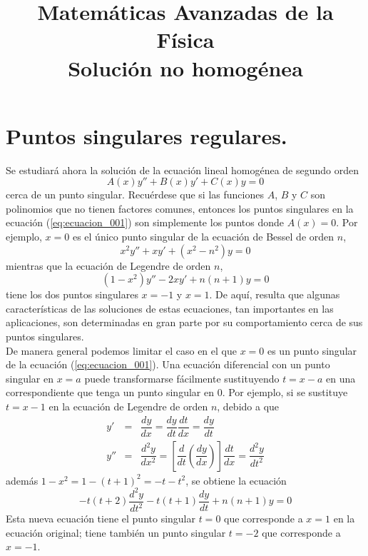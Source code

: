 
\title{Matemáticas Avanzadas de la Física \\ {\large Solución no homogénea}}
\date{ }

\renewcommand\labelenumii{\theenumi.{\arabic{enumii}}}
\maketitle
\fontsize{14}{14}\selectfont
\section{Puntos singulares regulares.}
Se estudiará ahora la solución de la ecuación lineal homogénea de segundo orden
\begin{equation}
A(x) y'' +  B(x)y' + C(x)y = 0
\label{eq:ecuacion_001}
\end{equation}
cerca de un punto singular. Recuérdese que si las funciones $A$, $B$ y $C$ son polinomios que no tienen factores comunes, entonces los puntos singulares en la ecuación (\ref{eq:ecuacion_001}) son simplemente los puntos donde $A(x)= 0$. Por ejemplo, $x=0$ es el único punto singular de la ecuación de Bessel de orden $n$,
\[ x^{2}y'' +  xy' + (x^{2} - n^{2})y = 0 \]
mientras que la ecuación de Legendre de orden $n$,
\[(1 - x^{2})y'' -  2xy' + n(n + 1)y = 0 \]
tiene los dos puntos singulares $x = -1$ y $x = 1$. De aquí, resulta que algunas características de las soluciones de estas ecuaciones, tan importantes en las aplicaciones, son determinadas en gran parte por su comportamiento cerca de sus puntos singulares.
\\
De manera general podemos limitar el caso en el que $x =0$ es un punto singular de la ecuación (\ref{eq:ecuacion_001}). Una ecuación diferencial con un punto singular en $x = a$ puede transformarse fácilmente sustituyendo $t = x - a$ en una correspondiente que tenga un punto singular en $0$. Por ejemplo, si se sustituye $t = x - 1$ en la ecuación de Legendre de orden $n$, debido a que
\begin{eqnarray*}
y' &=& \dfrac{dy}{dx} = \dfrac{dy}{dt}\dfrac{dt}{dx}= \dfrac{dy}{dt} \nonumber \\ 
y'' &=& \dfrac{d^{2} y}{d x^{2}} = \left[ \dfrac{d}{dt} \left( \dfrac{dy}{dx} \right) \right] \dfrac{dt}{dx} = \dfrac{d^{2}y}{d t^{2}} \nonumber
\end{eqnarray*}
además $1-x^{2} = 1 - (t+1)^{2} = -t -t^{2}$, se obtiene la ecuación
\[ -t (t+2) \dfrac{d^{2}y}{dt^{2}} - t(t+1) \dfrac{dy}{dt} + n(n+1) y = 0 \]
Esta nueva ecuación tiene el punto singular $t = 0$ que corresponde a $x = 1$ en la ecuación original; tiene también un punto singular $t = -2$ que corresponde a $x = -1$.
